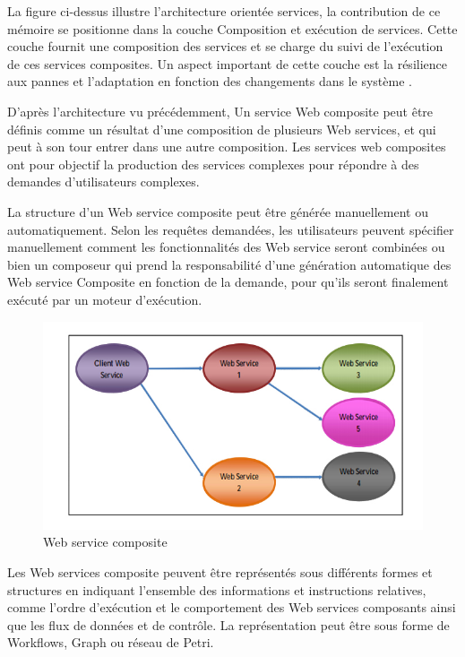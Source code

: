 La figure ci-dessus illustre l'architecture orientée services, la contribution de ce mémoire se positionne dans la couche Composition et exécution de services.
Cette couche fournit une composition des services et se charge du suivi de l’exécution de ces services composites. Un aspect important de cette couche est la résilience aux
pannes et l’adaptation en fonction des changements dans le système \cite{1}.



D'après l'architecture vu précédemment, Un service Web composite peut être définis comme un  résultat d’une composition de plusieurs Web services, et qui peut à son tour entrer dans une autre composition.
Les  services web composites ont pour objectif  la production des services complexes pour répondre à des demandes d’utilisateurs complexes. 

La structure d’un Web service composite peut être générée manuellement ou automatiquement. Selon les requêtes demandées, les utilisateurs peuvent spécifier manuellement comment les fonctionnalités des Web service seront combinées ou bien  un composeur qui prend la responsabilité d’une génération automatique des Web service Composite en fonction de la demande, pour qu’ils seront finalement exécuté par un moteur d’exécution.


\begin{figure}[H]
\begin{center}
\includegraphics[width=1\linewidth]{images/CWS.jpg}
\end{center}
\caption{Web service composite}
\label{fig:2}
\end{figure}



Les Web services composite peuvent être représentés sous différents formes et structures en indiquant l’ensemble des informations et instructions relatives, comme l’ordre d’exécution et le comportement des Web services composants ainsi que les flux de données  et de contrôle.
La représentation peut être sous forme de Workflows, Graph ou réseau de Petri.



